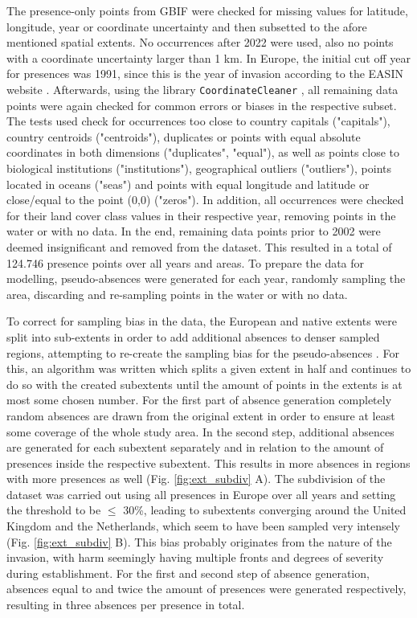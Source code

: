 \documentclass[12pt,a4paper]{article}
\begin{document}
The presence-only points from GBIF were checked for missing values for latitude, longitude, year or coordinate uncertainty and then subsetted to the afore mentioned spatial extents.
No occurrences after 2022 were used, also no points with a coordinate uncertainty larger than 1 km.
In Europe, the initial cut off year for presences was 1991, since this is the year of invasion according to the EASIN website \autocite{EASINintroharm}.
Afterwards, using the library \texttt{CoordinateCleaner} \autocite{zizka2019coordinatecleaner}, all remaining data points were again checked for common errors or biases in the respective subset.
The tests used check for occurrences too close to country capitals ("capitals"), country centroids ("centroids"), duplicates or points with equal absolute coordinates in both dimensions ("duplicates", "equal"), as well as points close to biological institutions ("institutions"), geographical outliers ("outliers"), points located in oceans ("seas") and points with equal longitude and latitude or close/equal to the point (0,0) ("zeros").
In addition, all occurrences were checked for their land cover class values in their respective year, removing points in the water or with no data.
In the end, remaining data points prior to 2002 were deemed insignificant and removed from the dataset.
This resulted in a total of 124.746 presence points over all years and areas.
To prepare the data for modelling, pseudo-absences were generated for each year, randomly sampling the area, discarding and re-sampling points in the water or with no data.

To correct for sampling bias in the data, the European and native extents were split into sub-extents in order to add additional absences to denser sampled regions, attempting to re-create the sampling bias for the pseudo-absences \autocite{phillips2009samplebias}.
For this, an algorithm was written which splits a given extent in half and continues to do so with the created subextents until the amount of points in the extents is at most some chosen number.
For the first part of absence generation completely random absences are drawn from the original extent in order to ensure at least some coverage of the whole study area.
In the second step, additional absences are generated for each subextent separately and in relation to the amount of presences inside the respective subextent.
This results in more absences in regions with more presences as well (Fig. \ref{fig:ext_subdiv} A).
The subdivision of the dataset was carried out using all presences in Europe over all years and setting the threshold to be $\leq$ 30\%, leading to subextents converging around the United Kingdom and the Netherlands, which seem to have been sampled very intensely (Fig. \ref{fig:ext_subdiv} B).
This bias probably originates from the nature of the invasion, with \gls{harm} seemingly having multiple fronts and degrees of severity during establishment.
For the first and second step of absence generation, absences equal to and twice the amount of presences were generated respectively, resulting in three absences per presence in total.
\end{document}
